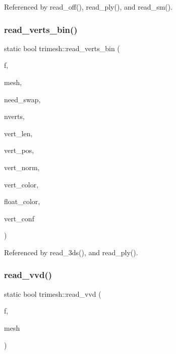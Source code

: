 Referenced by read\+\_\+off(), read\+\_\+ply(), and read\+\_\+sm().

\mbox{\label{namespacetrimesh_a89396ced1b73814bb870a9541b94b9d4}} 
\subsubsection{\texorpdfstring{read\+\_\+verts\+\_\+bin()}{read\_verts\_bin()}}
{\footnotesize\ttfamily static bool trimesh\+::read\+\_\+verts\+\_\+bin (\begin{DoxyParamCaption}\item[{F\+I\+LE $\ast$}]{f,  }\item[{\hyperlink{classtrimesh_1_1TriMesh}{Tri\+Mesh} $\ast$}]{mesh,  }\item[{bool \&}]{need\+\_\+swap,  }\item[{int}]{nverts,  }\item[{int}]{vert\+\_\+len,  }\item[{int}]{vert\+\_\+pos,  }\item[{int}]{vert\+\_\+norm,  }\item[{int}]{vert\+\_\+color,  }\item[{bool}]{float\+\_\+color,  }\item[{int}]{vert\+\_\+conf }\end{DoxyParamCaption})\hspace{0.3cm}{\ttfamily [static]}}



Referenced by read\+\_\+3ds(), and read\+\_\+ply().

\mbox{\label{namespacetrimesh_a388de28d8189208fbaa377ffedc14cb8}} 
\subsubsection{\texorpdfstring{read\+\_\+vvd()}{read\_vvd()}}
{\footnotesize\ttfamily static bool trimesh\+::read\+\_\+vvd (\begin{DoxyParamCaption}\item[{F\+I\+LE $\ast$}]{f,  }\item[{\hyperlink{classtrimesh_1_1TriMesh}{Tri\+Mesh} $\ast$}]{mesh }\end{DoxyParamCaption})\hspace{0.3cm}{\ttfamily [static]}}




